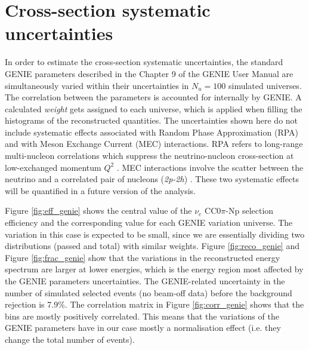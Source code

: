 \section{Cross-section systematic uncertainties}
In order to estimate the cross-section systematic uncertainties, the standard GENIE parameters described in the Chapter 9 of the GENIE User Manual \cite{Andreopoulos:2015wxa} are simultaneously varied within their uncertainties in $N_{u} = 100$ simulated universes. The correlation between the parameters is accounted for internally by GENIE. A calculated \emph{weight} gets assigned to each universe, which is applied when filling the histograms of the reconstructed quantities. The uncertainties shown here do not include systematic effects associated with Random Phase Approximation (RPA) and with Meson Exchange Current (MEC) interactions. RPA refers to long-range multi-nucleon correlations which suppress the neutrino-nucleon cross-section at low-exchanged momentum $Q^2$ \cite{Nieves:2011pp}. MEC interactions involve the scatter between the neutrino and a correlated pair of nucleons (\emph{2p-2h}) \cite{Bodek:2011ps}. These two systematic effects will be quantified in a future version of the analysis.

Figure \ref{fig:eff_genie} shows the central value of the $\nu_{e}$ CC0$\pi$-Np selection efficiency and the corresponding value for each GENIE variation universe. The variation in this case is expected to be small, since we are essentially dividing two distributions (passed and total) with similar weights. Figure \ref{fig:reco_genie} and Figure \ref{fig:frac_genie} show that the variations in the reconstructed energy spectrum are larger at lower energies, which is the energy region most affected by the GENIE parameters uncertainties. The GENIE-related uncertainty in the number of simulated selected events (no beam-off data) before the background rejection is 7.9\%.
The correlation matrix in Figure \ref{fig:corr_genie} shows that the bins are mostly positively correlated. This means that the variations of the GENIE parameters have in our case mostly a normalisation effect (i.e. they change the total number of events). 

